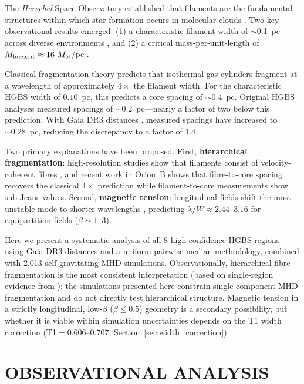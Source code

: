 \documentclass[twoside,twocolumn]{mnras}
\begin{document}
The \textit{Herschel} Space Observatory established that filaments are the fundamental
structures within which star formation occurs in molecular clouds \citep{Andre2010}.
Two key observational results emerged: (1) a characteristic filament width of $\sim$0.1~pc
across diverse environments \citep{Arzoumanian2011}, and (2) a critical mass-per-unit-length
of $M_{\rm line,crit} \approx 16~M_\odot$/pc \citep{Ostriker1964}.

Classical fragmentation theory \citep{Inutsuka1992} predicts that isothermal gas cylinders
fragment at a wavelength of approximately $4\times$ the filament width. For the
characteristic HGBS width of $0.10$~pc, this predicts a core spacing of $\sim 0.4$~pc.
Original HGBS analyses measured spacings of $\sim 0.2$~pc---nearly a factor of two below
this prediction. With Gaia DR3 distances \citep{Zhang2023}, measured spacings have
increased to $\sim 0.28$~pc, reducing the discrepancy to a factor of 1.4.

Two primary explanations have been proposed. First, \textbf{hierarchical fragmentation}:
high-resolution studies show that filaments consist of velocity-coherent fibres
\citep{Hacar2013}, and recent work in Orion~B \citep{Yang2024} shows that fibre-to-core
spacing recovers the classical $4\times$ prediction while filament-to-core measurements
show sub-Jeans values. Second, \textbf{magnetic tension}: longitudinal fields shift the
most unstable mode to shorter wavelengths \citep{Nakamura1993}, predicting
$\lambda/W \approx 2.44$--$3.16$ for equipartition fields ($\beta \sim 1$--$3$).

Here we present a systematic analysis of all 8 high-confidence HGBS regions using Gaia DR3 distances and a uniform pairwise-median methodology, combined with 2,013 self-gravitating MHD simulations. Observationally, hierarchical fibre fragmentation is the most consistent interpretation (based on single-region evidence from \citealt{Yang2024}); the simulations presented here constrain single-component MHD fragmentation and do not directly test hierarchical structure. Magnetic tension in a strictly longitudinal, low-$\beta$ ($\beta \leq 0.5$) geometry is a secondary possibility, but whether it is viable within simulation uncertainties depends on the T1 width correction (T1$=0.606$--$0.707$; Section~\ref{sec:width_correction}).

\section{OBSERVATIONAL ANALYSIS}
\end{document}
